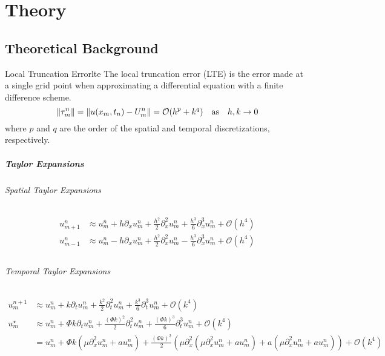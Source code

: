 \chapter{Theory}

\section{Theoretical Background}

\begin{definition}{Local Truncation Error}{lte}
  The local truncation error (LTE) is the error made at a single grid point when approximating a differential equation with a finite difference scheme.
  \[
    \lVert\tau_m^n\rVert = \lVert u(x_m, t_n) - U_m^n\rVert = \mathcal{O}(h^p + k^q) \quad \text{as} \quad h, k \to 0
  \]
  where \(p\) and \(q\) are the order of the spatial and temporal discretizations, respectively.
\end{definition}


\paragraph{Taylor Expansions}

\subparagraph{Spatial Taylor Expansions}
\begin{align*}
  u_{m+1}^n & \approx u_m^n + h \partial_x u_m^n + \frac{h^2}{2} \partial_x^2 u_m^n + \frac{h^3}{6} \partial_x^3 u_m^n + \mathcal{O}(h^4) \\
  u_{m-1}^n & \approx u_m^n - h \partial_x u_m^n + \frac{h^2}{2} \partial_x^2 u_m^n - \frac{h^3}{6} \partial_x^3 u_m^n + \mathcal{O}(h^4) \\
\end{align*}

\subparagraph{Temporal Taylor Expansions}
\begin{align*}
  u_m^{n+1} & \approx u_m^n + k \partial_t u_m^n + \frac{k^2}{2} \partial_t^2 u_m^n + \frac{k^3}{6} \partial_t^3 u_m^n + \mathcal{O}(k^4)                                                                                                            \\
  u_m^\star & \approx u_m^n + \Phi k \partial_t u_m^n + \frac{(\Phi k)^2}{2} \partial_t^2 u_m^n + \frac{(\Phi k)^3}{6} \partial_t^3 u_m^n + \mathcal{O}(k^4)                                                                                         \\
            & = u_m^n + \Phi k \left(\mu \partial_x^2 u_m^n + a u_m^n\right) + \frac{(\Phi k)^2}{2} \left(\mu \partial_x^2 \left(\mu \partial_x^2 u_m^n + a u_m^n\right) + a \left(\mu \partial_x^2 u_m^n + a u_m^n\right)\right) + \mathcal{O}(k^4) \\
\end{align*}

